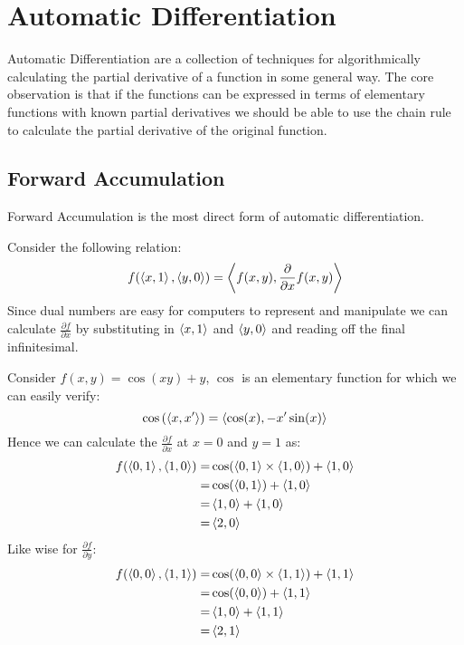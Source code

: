 \section{Automatic Differentiation}
Automatic Differentiation are a collection of techniques for algorithmically calculating the partial derivative of a function in some general way.
The core observation is that if the functions can be expressed in terms of elementary functions with known partial derivatives we should be able to use the chain rule to calculate the partial derivative of the original function.

\subsection{Forward Accumulation}
Forward Accumulation is the most direct form of automatic differentiation.

Consider the following relation:
\[f(\left\langle x,1 \right\rangle,\left\langle y,0 \right\rangle) = \left\langle f(x,y),\frac{\partial}{\partial x}f(x,y) \right\rangle\]
Since dual numbers are easy for computers to represent and manipulate we can calculate $\frac{\partial f}{\partial x}$ by substituting in $\left\langle x,1 \right\rangle$ and $\left\langle y,0 \right\rangle$ and reading off the final infinitesimal.

Consider $f(x,y) = \cos(xy)+y$, $\cos$ is an elementary function for which we can easily verify:
\[\cos\left(\left\langle x,x' \right\rangle\right) = \left\langle \cos(x),-x'\sin(x) \right\rangle\]
Hence we can calculate the $\frac{\partial f}{\partial x}$ at $x=0$ and $y=1$ as:
\begin{equation*}
\begin{aligned}
	f(\left\langle 0,1 \right\rangle,\left\langle 1,0 \right\rangle) =& \cos(\left\langle 0,1 \right\rangle\times\left\langle 1,0 \right\rangle)+\left\langle 1,0 \right\rangle \\
	=& \cos(\left\langle 0,1 \right\rangle)+\left\langle 1,0 \right\rangle \\
	=& \left\langle 1,0 \right\rangle+\left\langle 1,0 \right\rangle \\
	=& \left\langle 2,0 \right\rangle \\
\end{aligned}
\end{equation*}
Like wise for $\frac{\partial f}{\partial y}$:
\begin{equation*}
\begin{aligned}
	f(\left\langle 0,0 \right\rangle,\left\langle 1,1 \right\rangle) =& \cos(\left\langle 0,0 \right\rangle\times\left\langle 1,1 \right\rangle)+\left\langle 1,1 \right\rangle \\
	=& \cos(\left\langle 0,0 \right\rangle)+\left\langle 1,1 \right\rangle \\
	=& \left\langle 1,0 \right\rangle+\left\langle 1,1 \right\rangle \\
	=& \left\langle 2,1 \right\rangle \\
\end{aligned}
\end{equation*}

